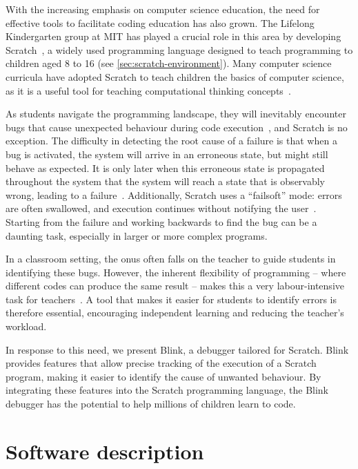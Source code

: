 \documentclass[../main]{subfiles}
\begin{document}
With the increasing emphasis on computer science education, the need for effective tools to facilitate coding education has also grown.
The Lifelong Kindergarten group at MIT has played a crucial role in this area by developing Scratch~\autocite{resnickScratchProgrammingAll2009}, a widely used programming language designed to teach programming to children aged 8 to 16 (see \cref{sec:scratch-environment}).
Many computer science curricula have adopted Scratch to teach children the basics of computer science, as it is a useful tool for teaching computational thinking concepts~\autocite{zhangSystematicReviewLearning2019}.

As students navigate the programming landscape, they will inevitably encounter bugs that cause unexpected behaviour during code execution~\autocite{zellerWhyProgramsFail2009}, and Scratch is no exception.
The difficulty in detecting the root cause of a failure is that when a bug is activated, the system will arrive in an erroneous state, but might still behave as expected.
It is only later when this erroneous state is propagated throughout the system that the system will reach a state that is observably wrong, leading to a failure~\autocite{ammannIntroductionSoftwareTesting2016}.
Additionally, Scratch uses a ``failsoft'' mode: errors are often swallowed, and execution continues without notifying the user~\autocite{hromkovic2021problem}.
Starting from the failure and working backwards to find the bug can be a daunting task, especially in larger or more complex programs.

In a classroom setting, the onus often falls on the teacher to guide students in identifying these bugs.
However, the inherent flexibility of programming -- where different codes can produce the same result -- makes this a very labour-intensive task for teachers~\autocite{kimDebuggingBlockbasedProgramming2018}.
A tool that makes it easier for students to identify errors is therefore essential, encouraging independent learning and reducing the teacher's workload.

In response to this need, we present Blink, a debugger tailored for Scratch.
Blink provides features that allow precise tracking of the execution of a Scratch program, making it easier to identify the cause of unwanted behaviour.
By integrating these features into the Scratch programming language, the Blink debugger has the potential to help millions of children learn to code.

\section{Software description}\label{sec:blink-software-description}
\end{document}
